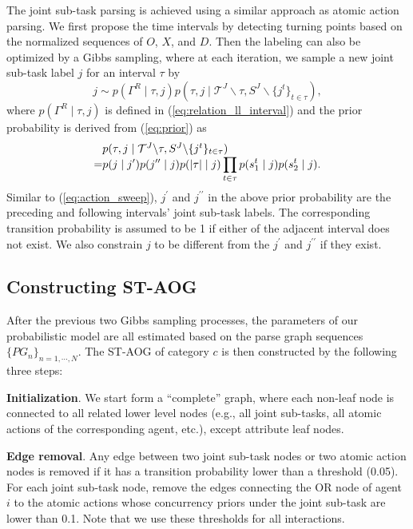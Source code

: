 \documentclass[letterpaper, 10 pt, conference]{ieeeconf}  %
\begin{document}
The joint sub-task parsing is achieved using a similar approach as atomic action parsing. We first propose the time intervals by detecting turning points based on the normalized sequences of $O$, $X$, and $D$. Then the labeling can also be optimized by a Gibbs sampling, where at each iteration, we sample a new joint sub-task label $j$ for an interval $\tau$ by
\begin{equation}
j \sim p(\Gamma^R \mid \tau, j)p(\tau, j \mid \mathcal{T}^J \backslash \tau, S^J \backslash \{j^t\}_{t \in \tau}),
\end{equation}
where $p(\Gamma^R \mid \tau, j)$ is defined in (\ref{eq:relation_ll_interval}) and the prior probability is derived from (\ref{eq:prior}) as
\begin{equation}
\setlength{\arraycolsep}{0pt}
\begin{array}{lcl}
&&p(\tau, j \mid \mathcal{T}^J \backslash \tau, S^J \backslash \{j^t\}_{t \in \tau})\\
&=&\displaystyle p(j \mid j^\prime)p(j^{\prime\prime} \mid j)p(|\tau| \mid j)\prod_{t\in \tau} p(s_1^t \mid j)p(s_2^t \mid j).
\end{array}
\label{eq:joint_sweep}
\end{equation}
Similar to (\ref{eq:action_sweep}), $j^\prime$ and $j^{\prime\prime}$ in the above prior probability are the preceding and following intervals' joint sub-task labels. The corresponding transition probability is assumed to be 1 if either of the adjacent interval does not exist. We also constrain $j$ to be different from the $j^\prime$ and $j^{\prime\prime}$ if they exist.





\subsection{Constructing ST-AOG}

After the previous two Gibbs sampling processes, the parameters of our probabilistic model are all estimated based on the parse graph sequences $\{PG_n\}_{n=1,\cdots,N}$. The ST-AOG of category $c$ is then constructed by the following three steps:
 
 \textbf{Initialization}. We start form a ``complete'' graph, where each non-leaf node is connected to all related lower level nodes (e.g., all joint sub-tasks, all atomic actions of the corresponding agent, etc.), except attribute leaf nodes. 
 
 \textbf{Edge removal}. Any edge between two joint sub-task nodes or two atomic action nodes is removed if it has a transition probability lower than a threshold (0.05). For each joint sub-task node, remove the edges connecting the OR node of agent $i$ to the atomic actions whose concurrency priors under the joint sub-task are lower than 0.1. Note that we use these thresholds for all interactions.
 
\end{document}
